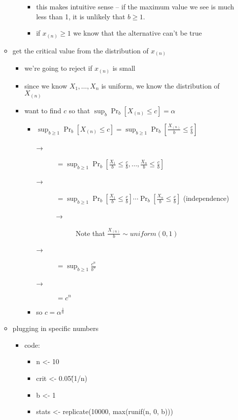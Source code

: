 \begin{itemize}
\begin{itemize}
\begin{itemize}
\begin{itemize}
\item this makes intuitive sense -- if the maximum value we
            see is much less than 1, it is unlikely that $b \geq
            1$.
\item if $x_{(n)} \geq 1$ we know that the alternative can't be true
\end{itemize}
\end{itemize}
\item get the critical value from the distribution of $x_{(n)}$
\begin{itemize}
\item we're going to reject if $x_{(n)}$ is small
\item since we know $X_1,\dots,X_n$ is uniform, we know the
          distribution of $X_{(n)}$
\item want to find $c$ so that $\sup_b \Pr_b[X_{(n)} \leq c] = \alpha$
\begin{itemize}
\item $\sup_{b \geq 1} \Pr_b[X_{(n)} \leq c] = \sup_{b\geq 1} \Pr_b[\tfrac{X_{(n)}}{b} \leq \tfrac{c}{b}]$
\begin{description}
\item[→] $=\sup_{b \geq 1} \Pr_b[\tfrac{X_1}{b} \leq \tfrac{c}{b}, \dots, \tfrac{X_n}{b} \leq \tfrac{c}{b}]$
\item[→] $=\sup_{b \geq 1} \Pr_b[\tfrac{X_1}{b} \leq \tfrac{c}{b}] \cdots \Pr_b[\tfrac{X_n}{b} \leq \tfrac{c}{b}]$ (independence)
\begin{description}
\item[→] Note that $\tfrac{X_{(n)}}{b} \sim uniform(0,1)$
\end{description}
\item[→] $= \sup_{b \geq 1} \tfrac{c^n}{b^n}$
\item[→] $= c^n$
\end{description}
\item so $c = \alpha^{\frac1n}$
\end{itemize}
\end{itemize}
\item plugging in specific numbers
\begin{itemize}
\item code:
\begin{itemize}
\item n <- 10
\item crit <- 0.05\^(1/n)
\item b <- 1
\item stats <- replicate(10000, max(runif(n, 0, b)))

\end{itemize}
\end{itemize}
\end{itemize}
\end{itemize}

